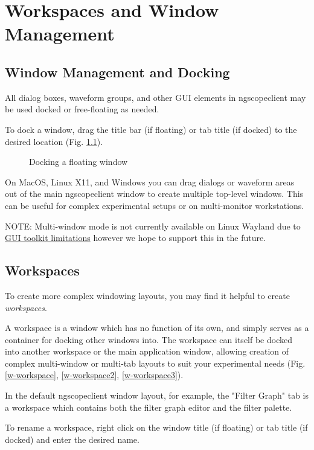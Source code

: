 \chapter{Workspaces and Window Management}

\section{Window Management and Docking}

All dialog boxes, waveform groups, and other GUI elements in ngscopeclient may be used docked or free-floating as
needed.

To dock a window, drag the title bar (if floating) or tab title (if docked) to the desired location (Fig.
\ref{w-docking}).

\begin{figure}[h]
\centering
{}
\caption{Docking a floating window}
\label{w-docking}
\end{figure}

On MacOS, Linux X11, and Windows you can drag dialogs or waveform areas out of the main ngscopeclient window to create
multiple top-level windows. This can be useful for complex experimental setups or on multi-monitor workstations.

NOTE: Multi-window mode is not currently available on Linux Wayland due to
\href{https://github.com/ocornut/imgui/issues/8609}{GUI toolkit limitations} however we hope to support this in the
future.

\section{Workspaces}

To create more complex windowing layouts, you may find it helpful to create \emph{workspaces}.

A workspace is a window which has no function of its own, and simply serves as a container for docking other windows
into. The workspace can itself be docked into another workspace or the main application window, allowing creation of
complex multi-window or multi-tab layouts to suit your experimental needs (Fig. \ref{w-workspace}, \ref{w-workspace2},
\ref{w-workspace3}).

In the default ngscopeclient window layout, for example, the "Filter Graph" tab is a workspace which contains both the
filter graph editor and the filter palette.

To rename a workspace, right click on the window title (if floating) or tab title (if docked) and enter the desired
name.

